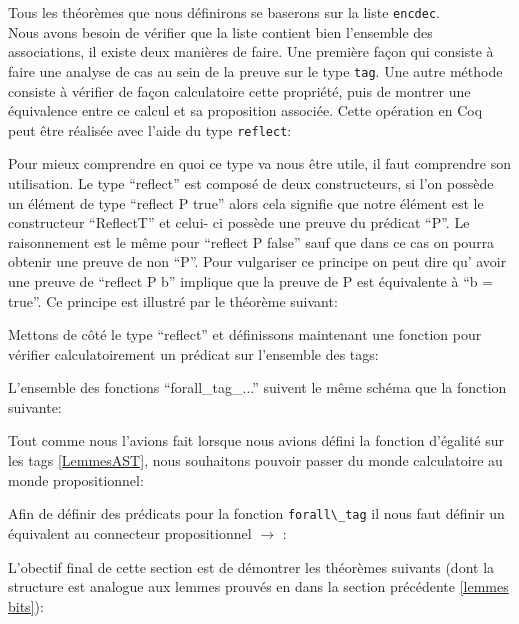\documentclass {article}
\newcommand{\codefrom}[3]
           {}
\theoremstyle{definition}
\theoremstyle{remark}
\newcommand{\fun}[1]{\lstinline!#1!}
\begin{document}
Tous les théorèmes que nous définirons se baserons sur la liste \fun{encdec}. \\
Nous avons besoin de vérifier que la liste contient bien l'ensemble des associations,
il existe deux manières de faire. Une première façon qui consiste à faire une analyse de cas
au sein de la preuve sur le type \fun{tag}.
Une autre méthode consiste à vérifier de façon calculatoire cette propriété, puis de montrer
une équivalence entre ce calcul et sa proposition associée. 
Cette opération en Coq peut être réalisée avec l'aide du type \fun{reflect}:

\codefrom{rapport}{definitions}{reflect}

Pour mieux comprendre en quoi ce type va nous être utile, il faut comprendre son utilisation.
Le type ``reflect'' est composé de deux constructeurs, si l'on possède un élément de type
``reflect P true'' alors cela signifie que notre élément est le constructeur ``ReflectT''
et celui- ci possède une preuve du prédicat ``P''. Le raisonnement est le même pour ``reflect P false''
sauf que dans ce cas on pourra obtenir une preuve de non ``P''. Pour vulgariser ce
principe on peut dire qu' avoir une preuve de ``reflect P b'' implique que la preuve
de P est équivalente à ``b = true''. Ce principe est illustré par le théorème suivant:

\codefrom{rapport}{definitions}{reflect_iff}


Mettons de côté le type ``reflect'' et définissons maintenant une fonction
pour vérifier calculatoirement un prédicat sur l'ensemble des tags:

\codefrom{src}{association_list}{forall_tag}

L'ensemble des fonctions ``forall\_tag\_...'' suivent le même schéma que la fonction suivante:

\codefrom{src}{association_list}{forall_tag_uno}

Tout comme nous l'avions fait lorsque nous avions défini la fonction d'égalité sur les tags \ref{LemmesAST},
nous souhaitons pouvoir passer du monde calculatoire au monde propositionnel:

\codefrom{src}{association_list}{helpBefore1}
\codefrom{src}{association_list}{helpBefore2}

Afin de définir des prédicats pour la fonction \fun{forall\_tag} il nous faut définir un
équivalent au connecteur propositionnel \ensuremath{\rightarrow} :

\codefrom{src}{association_list}{imply}

L'obectif final de cette section est de démontrer les théorèmes suivants (dont la structure est analogue aux lemmes prouvés
en dans la section précédente \ref{lemmes bits}):
\end{document}
